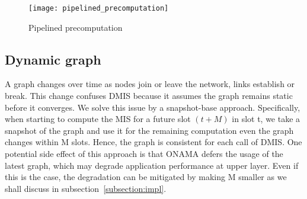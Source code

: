 \documentclass[conference]{IEEEtran}
\newcommand{\figWidth}{0.9\linewidth}	\newcommand{\figWidthM}{.99\linewidth}
\begin{document}
\begin{figure}[!tbhp]
\centering
\texttt{[image: pipelined\_precomputation]}
\caption{Pipelined precomputation}
\label{fig:pipelined_precomputation}
\end{figure}

\subsection{Dynamic graph}
A graph changes over time as nodes join or leave the network, links establish or break. This change confuses DMIS because it assumes the graph remains static before it converges. We solve this issue by a snapshot-base approach. Specifically, when starting to compute the MIS for a future slot $(t + M)$ in slot t, we take a snapshot of the graph and use it for the remaining computation even the graph changes within M slots. Hence, the graph is consistent for each call of DMIS. One potential side effect of this approach is that ONAMA defers the usage of the latest graph, which may degrade application performance at upper layer. 
Even if this is the case, the degradation can be mitigated by making M smaller as we shall discuss in subsection~\ref{subsection:impl}.	
\end{document}
